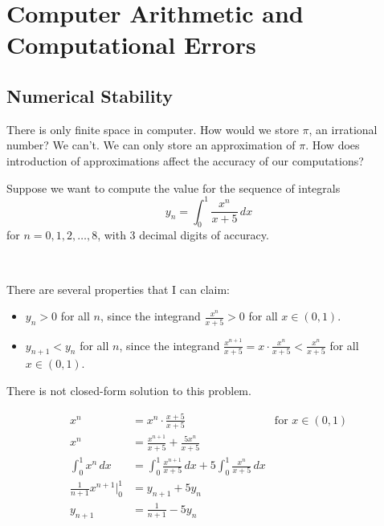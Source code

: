 \chapter{Computer Arithmetic and Computational Errors}

\section{Numerical Stability}

There is only finite space in computer. How would we store \( \pi \), an irrational number? We can't. We can only store an approximation of \( \pi \). How does introduction of approximations affect the accuracy of our computations?

\begin{example}
    Suppose we want to compute the value for the sequence of integrals \[
        y_n = \int_0^1 \frac{x^n}{x + 5} \, dx
    \] for \( n = 0, 1, 2, \ldots, 8 \), with 3 decimal digits of accuracy.

        {~~~}

    There are several properties that I can claim:

    \begin{itemize}
        \item \( y_n > 0 \) for all \( n \), since the integrand \( \frac{x^n}{x + 5} > 0 \) for all \( x \in (0, 1) \).
        \item \( y_{n+1} < y_n \) for all \( n \), since the integrand \( \frac{x^{n+1}}{x + 5}
              = x \cdot \frac{x^n}{x + 5} < \frac{x^n}{x + 5} \) for all \( x \in (0, 1) \).
    \end{itemize}

    There is not closed-form solution to this problem.

    \begin{align*}
        x^n
         & = x^n \cdot \frac{x + 5}{x + 5}
         & \text{for } x \in (0, 1)                                                  \\
        x^n
         & = \frac{x^{n+1}}{x + 5} + \frac{5x^n}{x + 5}                              \\
        \int_0^1 x^n \,dx
         & = \int_0^1 \frac{x^{n+1}}{x + 5} \,dx + 5 \int_0^1 \frac{x^n}{x + 5} \,dx \\
        \frac{1}{n + 1} x^{n+1} \Big|_0^1
         & = y_{n+1} + 5 y_n                                                         \\
        y_{n+1}
         & = \frac{1}{n + 1} - 5 y_n
    \end{align*}


\end{example}
